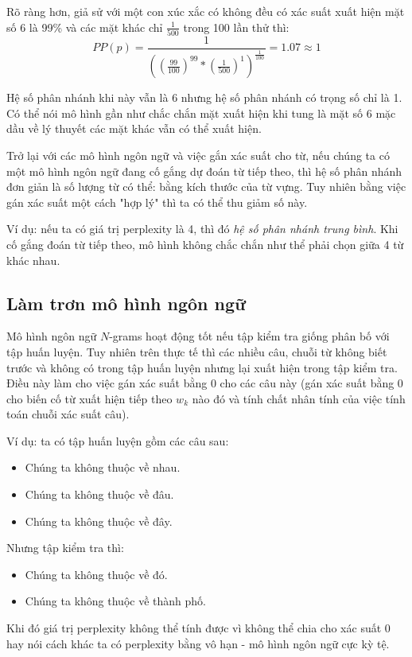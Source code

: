  Rõ ràng hơn, giả sử với một con xúc xắc có không đều có xác suất xuất hiện mặt số 6 là 99\% và các mặt khác chỉ $\frac{1}{500}$ trong 100 lần thử thì:
  $$PP(p)=\frac{1}{((\frac{99}{100})^{99}*(\frac{1}{500})^{1})^{\frac{1}{100}}}=1.07\approx 1$$
  
  Hệ số phân nhánh khi này vẫn là 6 nhưng hệ số phân nhánh có trọng số chỉ là 1. Có thể nói mô hình gần như chắc chắn mặt xuất hiện khi tung là mặt số 6 mặc dầu về lý thuyết các mặt khác vẫn có thể xuất hiện. 
  
  Trở lại với các mô hình ngôn ngữ và việc gắn xác suất cho từ, nếu chúng ta có một mô hình ngôn ngữ đang cố gắng dự đoán từ tiếp theo, thì hệ số phân nhánh đơn giản là số lượng từ có thể: bằng kích thước của từ vựng. Tuy nhiên bằng việc gán xác suất một cách "hợp lý" thì ta có thể thu giảm số này.
  
  Ví dụ: nếu ta có giá trị perplexity là 4, thì đó \textit{hệ số phân nhánh trung bình}. Khi cố gắng đoán từ tiếp theo, mô hình không chắc chắn như thể phải chọn giữa 4 từ khác nhau.
  
  \subsection{Làm trơn mô hình ngôn ngữ}
  Mô hình ngôn ngữ $N$-grams hoạt động tốt nếu tập kiểm tra giống phân bố với tập huấn luyện. Tuy nhiên trên thực tế thì các nhiều câu, chuỗi từ không biết trước và không có trong tập huấn luyện nhưng lại xuất hiện trong tập kiểm tra. Điều này làm cho việc gán xác suất bằng $0$ cho các câu này (gán xác suất bằng $0$ cho biến cố từ xuất hiện tiếp theo $w_k$ nào đó và tính chất nhân tính của việc tính toán chuỗi xác suất câu). 
  
  Ví dụ: ta có tập huấn luyện gồm các câu sau:
  \begin{itemize}
      \item Chúng ta không thuộc về nhau.
      \item Chúng ta không thuộc về đâu.
      \item Chúng ta không thuộc về đây.
  \end{itemize}
  
  Nhưng tập kiểm tra thì:
  \begin{itemize}
  \item Chúng ta không thuộc về đó.
  \item Chúng ta không thuộc về thành phố.
  \end{itemize}
  
  Khi đó giá trị perplexity không thể tính được vì không thể chia cho xác suất $0$ hay nói cách khác ta có perplexity bằng vô hạn - mô hình ngôn ngữ cực kỳ tệ. 
  
